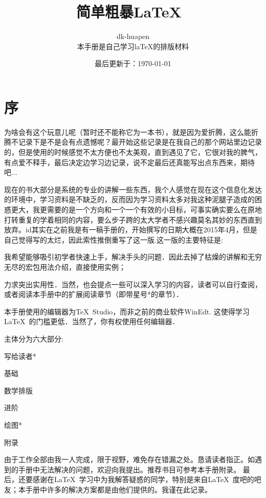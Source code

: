 
\title{简单粗暴\LaTeX\ }
\author{dk-huapen\\
{本手册是自己学习laTeX的排版材料}
}
\date{最后更新于：\today}
\makeindex%


\maketitle
\setlength{\lineskiplimit}{0pt}
\tableofcontents
\setlength{\lineskiplimit}{3pt}
\chapter{序}
为啥会有这个玩意儿呢（暂时还不能称它为一本书），就是因为爱折腾，这么能折腾不记录下是不是会有点遗憾呢？最开始这些记录是在我自己的那个网站里边记录的，但是使用的时候感觉不太方便也不太美观，直到遇见了它，它很对我的脾气，有点爱不释手，最后决定边学习边记录，说不定最后还真能写出点东西来，期待吧...

现在的书大部分是系统的专业的讲解一些东西，我个人感觉在现在这个信息化发达的环境中，学习资料是不缺乏的，反而因为学习资料太多对我这种泥腿子造成的困惑更大，我更需要的是一个方向和一个一个有效的小目标，可事实确实要么在原地打转重复的学着相同的内容，要么步子跨的太大学者不感兴趣莫名其妙的东西直到放弃。id其实在之前我是有一稿手册的，开始撰写的日期大概在2015年4月，但是自己觉得写的太烂，因此索性推倒重写了这一版.这一版的主要特征是:
\begin{feae}
	\item 我希望能够吸引初学者快速上手，解决手头的问题．因此去掉了枯燥的讲解和无穷无尽的宏包用法介绍，直接使用实例；
	\item 力求突出实用性．当然，也会提点一些可以深入学习的内容，读者可以自行查阅，或者阅读本手册中的扩展阅读章节（即带星号*的章节）．
\	\item 本手册使用的编辑器为\TeX\ Studio，而非之前的商业软件WinEdt. 这使得学习\LaTeX\ 的门槛更低．当然了，你有权使用任何编辑器．
\end{feae}
		主体分为六大部分\cite{LaTeX-cn,LHY2013latex}:
\begin{fead}
	\item[写给读者*]
	\item[基础]
	\item[数学排版]
	\item[进阶]
	\item[绘图*]
	\item[附录]
\end{fead}
由于工作全部由我一人完成，限于视野，难免存在错漏之处。恳请读者指正。如遇到的手册中无法解决的问题，欢迎向我提出。推荐书目可参考本手册附录。
最后，还要感谢在\LaTeX\ 学习中为我解答疑惑的同学，特别是来自\LaTeX\ 度吧的吧友；本手册中许多的解决方案都是由他们提供的。我谨在此记录。

